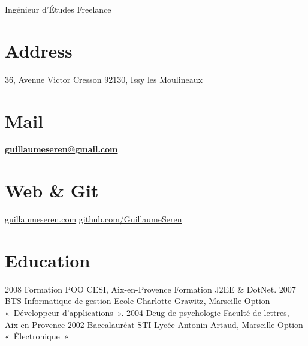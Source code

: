 \documentclass[]{GuillaumeSeren-cv}
\begin{document}
      {Ingénieur d'Études Freelance}

\begin{aside}
  \section{Address}
    36, Avenue Victor Cresson
    92130, Issy les Moulineaux
    ~
  \section{Mail}
    \href{mailto:guillaumeseren@gmail.com}{\textbf{guillaumeseren@gmail.com}}
    ~
  \section{Web \& Git}
    \href{http://guillaumeseren.com/}{guillaumeseren.com}
    \href{https://github.com/GuillaumeSeren}{github.com/GuillaumeSeren}
    ~
\end{aside}

\section{Education}
\begin{entrylist}
  \entry
    {2008}
    {Formation POO}
    {CESI, Aix-en-Provence}
    {Formation J2EE \& DotNet.}
  \entry
    {2007}
    {BTS Informatique de gestion}
    {Ecole Charlotte Grawitz, Marseille}
    {Option « Développeur d'applications ».}
  \entry
    {2004}
    {Deug de psychologie}
    {Faculté de lettres, Aix-en-Provence}
    {}
  \entry
    {2002}
    {Baccalauréat STI}
    {Lycée Antonin Artaud, Marseille}
    {Option « Électronique »}
\end{entrylist}
\end{document}

